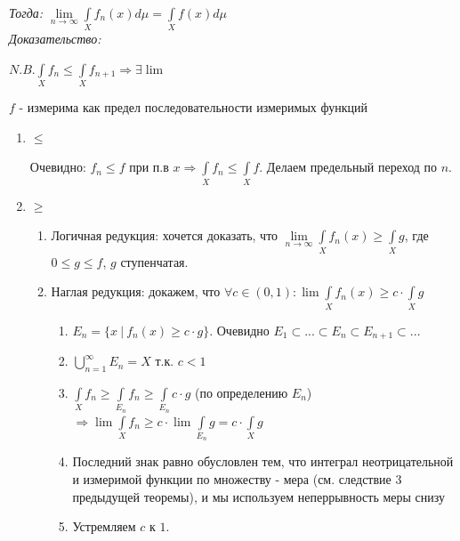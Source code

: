 \documentclass[paper=a4, fontsize=17pt]{article}
\begin{document}
\emph{Тогда:} $\lim\limits_{n \rightarrow \infty} \int\limits_{X}f_n(x)d\mu = \int\limits_{X}f(x)d\mu$
\\

\emph{Доказательство:}

$N.B. \int\limits_{X}f_n \leqslant \int\limits_{X}f_{n+1} \Rightarrow \exists \lim$

$f$ - измерима как предел последовательности измеримых функций

\begin{enumerate}
	\item $\leqslant$

	Очевидно: $f_n \leqslant f$ при п.в $x \Rightarrow \int\limits_{X}f_n \leqslant \int\limits_{X}f$. Делаем предельный переход по $n$.

	\item $\geqslant$
		\begin{enumerate}
			\item Логичная редукция: хочется доказать, что $\lim\limits_{n \rightarrow \infty} \int\limits_{X}f_n(x) \geqslant \int\limits_{X}g$, где $0 \leqslant g \leqslant f$, $g$ ступенчатая.

			\item Наглая редукция: докажем, что $\forall c \in (0,1): \lim\int\limits_{X}f_n(x) \geqslant c \cdot \int\limits_{X}g$
				\begin{enumerate}
					\item $E_n = \{x\ |\ f_n(x) \geqslant c \cdot g\}$. Очевидно $E_1 \subset ... \subset E_n \subset E_{n + 1} \subset ...$

					\item $\bigcup\limits_{n=1}^{\infty}E_n = X$ т.к. $c < 1$

					\item $\int\limits_{X}f_n \geqslant \int\limits_{E_n}f_n \geqslant \int\limits_{E_n}c \cdot g$ (по определению $E_n$)\\
                    $\Rightarrow \lim \int\limits_{X}f_n \geqslant c \cdot \lim \int\limits_{E_n}g = c \cdot \int\limits_{X}g$

					\item Последний знак равно обусловлен тем, что интеграл неотрицательной и измеримой функции по множеству - мера (см. следствие 3 предыдущей теоремы), и мы используем неперрывность меры снизу

                    \item Устремляем $c$ к $1$.
				\end{enumerate}
		\end{enumerate}
\end{enumerate}
\end{document}
